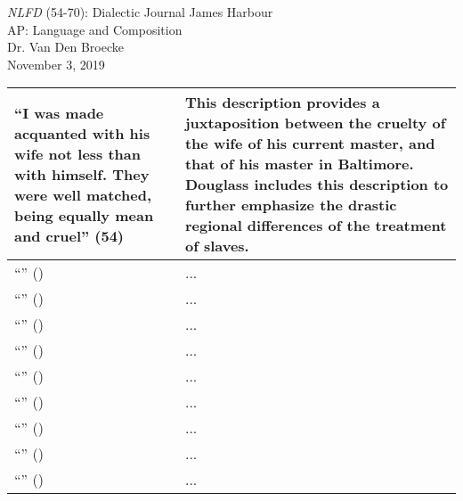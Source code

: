 \documentclass[12pt]{article}
\begin{document}
\begin{titlepage}
    \begin{center}
        \vspace*{1cm}
        \Large \emph{NLFD} (54-70): Dialectic Journal
        \vfill
        \large
        James Harbour\\
        \vspace{0.4cm}
        AP: Language and Composition\\
        \vspace{0.4cm}
        Dr. Van Den Broecke\\
        \vspace{0.4cm}
        November 3, 2019
        \vspace{1cm}
    \end{center}
\end{titlepage}

\begin{longtable}{| p{} | p{} |}
  \hline
  ``I was made acquanted with his wife not less than with himself. They were well matched, being equally mean and cruel'' (54) & This description provides a juxtaposition between the cruelty of the wife of his current master, and that of his master in Baltimore. Douglass includes this description to further emphasize the drastic regional differences of the treatment of slaves.   \\
  \hline
  ``'' () & ... \\
  \hline
  ``'' () & ... \\
  \hline
  ``'' () & ... \\
  \hline
  ``'' () & ... \\
  \hline
  ``'' () & ... \\
  \hline
  ``'' () & ... \\
  \hline
  ``'' () & ... \\
  \hline
  ``'' () & ... \\
  \hline
  ``'' () & ... \\
  \hline
\end{longtable}
\end{document}

